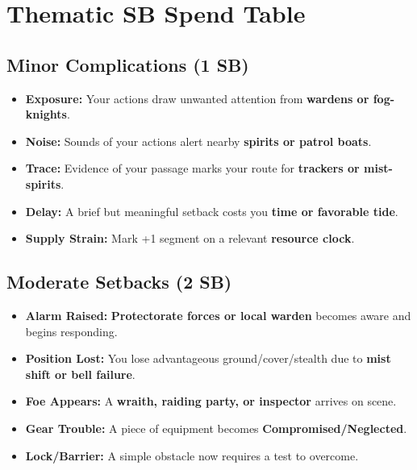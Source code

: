 
\section*{Thematic SB Spend Table}
\label{sec:mistlands-sb}

\subsection*{Minor Complications (1 SB)}
\begin{itemize}
\item \textbf{Exposure:} Your actions draw unwanted attention from \textbf{wardens or fog-knights}.
\item \textbf{Noise:} Sounds of your actions alert nearby \textbf{spirits or patrol boats}.
\item \textbf{Trace:} Evidence of your passage marks your route for \textbf{trackers or mist-spirits}.
\item \textbf{Delay:} A brief but meaningful setback costs you \textbf{time or favorable tide}.
\item \textbf{Supply Strain:} Mark +1 segment on a relevant \textbf{resource clock}.
\end{itemize}

\subsection*{Moderate Setbacks (2 SB)}
\begin{itemize}
\item \textbf{Alarm Raised:} \textbf{Protectorate forces or local warden} becomes aware and begins responding.
\item \textbf{Position Lost:} You lose advantageous ground/cover/stealth due to \textbf{mist shift or bell failure}.
\item \textbf{Foe Appears:} A \textbf{wraith, raiding party, or inspector} arrives on scene.
\item \textbf{Gear Trouble:} A piece of equipment becomes \textbf{Compromised/Neglected}.
\item \textbf{Lock/Barrier:} A simple obstacle now requires a test to overcome.
\end{itemize}

